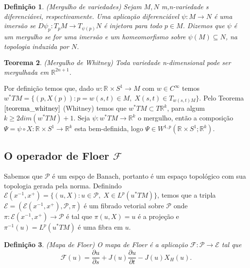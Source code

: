 \documentclass[12pt]{book}
\newtheorem{teorema}{Teorema}[section]
\newtheorem{definicao}[teorema]{Definição}
\newcommand{\caminhosexponenciaisconectantesabrev}{\mathcal{P}}
\newcommand{\circulo}{S^{1}}
\newcommand{\derivadaparcial}[2]{\frac{\partial #1}{\partial #2}}
\newcommand{\espacosobolevcontradominio}[2]{W^{1,p}(#1;#2)}
\newcommand{\fibradocaminhosexponenciais}{\mathcal{E}(x^{-1}, x^{+})}
\newcommand{\fibradocaminhosexponenciaisabrev}{\mathcal{E}}
\newcommand{\mapafloer}{\mathcal{F}}
\newcommand{\mapafloerdefinicao}[1]{\derivadaparcial{#1}{s} + J(#1)\derivadaparcial{#1}{t} - J(#1)X_{H}(#1)}
\newcommand{\mapafloerparametro}[1]{\mathcal{F}(#1)}
\newcommand{\pullbackfibradotangente}[2]{#1^{*}T#2}
\newcommand{\pullbackfibradotangenteM}[1]{\pullbackfibradotangente{#1}{M}}
\newcommand{\retacartesianocirculo}{\real{} \times \circulo}
\newcommand{\real}[1]{\mathbb{R}^{#1}}
\begin{document}
	\begin{definicao}\label{definicao_mergulho_variedades}
		(Mergulho de variedades) Sejam $M, N$ m,n-variedade s diferenciávei, respectivamente. Uma aplicação diferenciável $\psi:M\to N$ é uma imersão se $D\psi_{p}:T_{p}M\to T_{\psi(p)}N$ é injetora para todo $p \in M$. Dizemos que $\psi$ é um mergulho se for uma imersão e um homeomorfismo sobre $\psi(M) \subseteq N$, na topologia induzida por $N$. 
	\end{definicao}
	
	\begin{teorema}\label{teorema_whitney}
		(Mergulho de Whitney) Toda variedade n-dimensional pode ser mergulhada em $\real{2n+1}$.
	\end{teorema}
	
	Por definição temos que, dado $w : \retacartesianocirculo \to M $ com $w \in C^{\infty}$ temos $\pullbackfibradotangenteM{w} = \{(p, X(p)) : p = w(s,t) \in M, \; X(s,t) \in T_{w(s,t)M} \}$. Pelo Teorema $\ref{teorema_whitney}$ (Whitney) temos que $\pullbackfibradotangenteM{w} \subset T\real{k}$, para algum $k \geq 2 dim(\pullbackfibradotangenteM{w}) +1$. Seja $\psi : \pullbackfibradotangenteM{w} \to \real{k}$ o mergulho, então a composição $\Psi=\psi \circ X:\retacartesianocirculo \to \real{k}$ esta bem-definida, logo $\Psi \in \espacosobolevcontradominio{\retacartesianocirculo}{\real{k}}$. 
	
	\subsection{O operador de Floer $\mapafloer$}
	
	Sabemos que $\caminhosexponenciaisconectantesabrev$ é um espço de Banach, portanto é um espaço topológico com sua topologia gerada pela norma. Definindo $\fibradocaminhosexponenciais =\{(u, X): u \in \caminhosexponenciaisconectantesabrev,\; X \in L^{p}(\pullbackfibradotangenteM{u})\}$, temos que a tripla $
	\fibradocaminhosexponenciaisabrev= (\fibradocaminhosexponenciais, \caminhosexponenciaisconectantesabrev, \pi)
	$ é um fibrado vetorial sobre $\caminhosexponenciaisconectantesabrev$  onde $\pi: \fibradocaminhosexponenciais \to \caminhosexponenciaisconectantesabrev$ é tal que $\pi(u, X)=u$ é a projeção e $\pi^{-1}(u) = L^{p}(\pullbackfibradotangenteM{u})$ é uma fibra em $u$.
	
	\begin{definicao}
		(Mapa de Floer) O mapa de Floer é a aplicação $\mapafloer: \caminhosexponenciaisconectantesabrev \to \fibradocaminhosexponenciaisabrev$ tal que
		$$
		\mapafloerparametro{u} =\mapafloerdefinicao{u}.
		$$
	\end{definicao}
	
\end{document}
